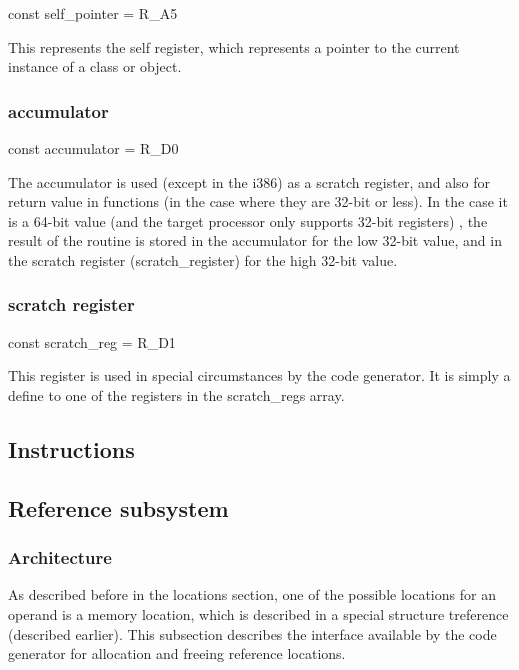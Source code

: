 \documentclass [a4paper,12pt]{article}
\begin{document}
\textsf{const self{\_}pointer = R{\_}A5}

This represents the self register, which represents a pointer to the current
instance of a class or object.

\subsubsection{accumulator}
\label{subsubsec:accumulatorents}

\textsf{const accumulator = R{\_}D0}

The accumulator is used (except in the i386) as a scratch register, and also
for return value in functions (in the case where they are 32-bit or less).
In the case it is a 64-bit value (and the target processor only supports
32-bit registers) , the result of the routine is stored in the accumulator
for the low 32-bit value, and in the scratch register
(\textsf{scratch{\_}register}) for the high 32-bit value.

\subsubsection{scratch register}
\label{subsubsec:mylabel27}

\textsf{const scratch{\_}reg = R{\_}D1}

This register is used in special circumstances by the code generator. It is
simply a define to one of the registers in the \textsf{scratch{\_}regs
}array.

\subsection{Instructions}
\label{subsec:instructionsr}

\subsection{Reference subsystem}
\label{subsec:reference}

\subsubsection{Architecture}
\label{subsubsec:architecturebsysteme}

As described before in the locations section, one of the possible locations
for an operand is a memory location, which is described in a special
structure \textsf{treference} (described earlier). This subsection describes
the interface available by the code generator for allocation and freeing
reference locations.
\end{document}
